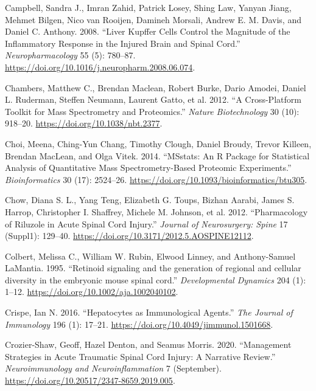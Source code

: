 \documentclass[9pt,lineno]{elife}
\newlength{\cslhangindent}
\newlength{\cslentryspacingunit} %
\newenvironment{CSLReferences}[2] %
 {%
  \setlength{\parindent}{0pt}
  \ifodd #1
  \let\oldpar\par
  \def\par{\hangindent=\cslhangindent\oldpar}
  \fi
  \setlength{\parskip}{#2\cslentryspacingunit}
 }%
 {}
\begin{document}
\begin{landscape}
\begin{landscape}
\begin{landscape}
\begin{landscape}
\begin{CSLReferences}{1}{0}
\leavevmode{}%
Campbell, Sandra J., Imran Zahid, Patrick Losey, Shing Law, Yanyan Jiang, Mehmet Bilgen, Nico van Rooijen, Damineh Morsali, Andrew E. M. Davis, and Daniel C. Anthony. 2008. {``Liver {Kupffer} Cells Control the Magnitude of the Inflammatory Response in the Injured Brain and Spinal Cord.''} \emph{Neuropharmacology} 55 (5): 780--87. \url{https://doi.org/10.1016/j.neuropharm.2008.06.074}.

\leavevmode{}%
Chambers, Matthew C., Brendan Maclean, Robert Burke, Dario Amodei, Daniel L. Ruderman, Steffen Neumann, Laurent Gatto, et al. 2012. {``A Cross-Platform Toolkit for Mass Spectrometry and Proteomics.''} \emph{Nature Biotechnology} 30 (10): 918--20. \url{https://doi.org/10.1038/nbt.2377}.

\leavevmode{}%
Choi, Meena, Ching-Yun Chang, Timothy Clough, Daniel Broudy, Trevor Killeen, Brendan MacLean, and Olga Vitek. 2014. {``{MSstats}: An {R} Package for Statistical Analysis of Quantitative Mass Spectrometry-Based Proteomic Experiments.''} \emph{Bioinformatics} 30 (17): 2524--26. \url{https://doi.org/10.1093/bioinformatics/btu305}.

\leavevmode{}%
Chow, Diana S. L., Yang Teng, Elizabeth G. Toups, Bizhan Aarabi, James S. Harrop, Christopher I. Shaffrey, Michele M. Johnson, et al. 2012. {``Pharmacology of Riluzole in Acute Spinal Cord Injury.''} \emph{Journal of Neurosurgery: Spine} 17 (Suppl1): 129--40. \url{https://doi.org/10.3171/2012.5.AOSPINE12112}.

\leavevmode{}%
Colbert, Melissa C., William W. Rubin, Elwood Linney, and Anthony-Samuel LaMantia. 1995. {``{Retinoid signaling and the generation of regional and cellular diversity in the embryonic mouse spinal cord}.''} \emph{Developmental Dynamics} 204 (1): 1--12. \url{https://doi.org/10.1002/aja.1002040102}.

\leavevmode{}%
Crispe, Ian N. 2016. {``Hepatocytes as {Immunological Agents}.''} \emph{The Journal of Immunology} 196 (1): 17--21. \url{https://doi.org/10.4049/jimmunol.1501668}.

\leavevmode{}%
Crozier-Shaw, Geoff, Hazel Denton, and Seamus Morris. 2020. {``Management Strategies in Acute Traumatic Spinal Cord Injury: A Narrative Review.''} \emph{Neuroimmunology and Neuroinflammation} 7 (September). \url{https://doi.org/10.20517/2347-8659.2019.005}.


\end{CSLReferences}
\end{landscape}
\end{landscape}
\end{landscape}
\end{landscape}
\end{document}
